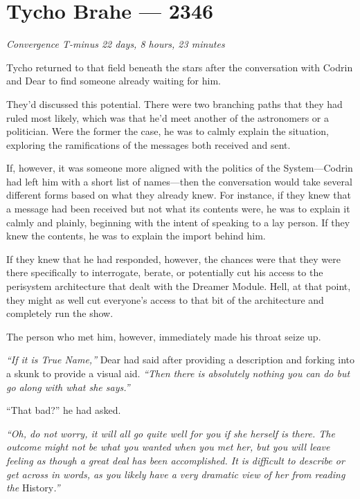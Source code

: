 \hypertarget{tycho-brahe-2346}{%
\chapter{Tycho Brahe — 2346}}

\begin{center}
\emph{Convergence T-minus 22 days, 8 hours, 23 minutes}
\end{center}

\noindent Tycho returned to that field beneath the stars after the conversation with Codrin and Dear to find someone already waiting for him.

They'd discussed this potential. There were two branching paths that they had ruled most likely, which was that he'd meet another of the astronomers or a politician. Were the former the case, he was to calmly explain the situation, exploring the ramifications of the messages both received and sent.

If, however, it was someone more aligned with the politics of the System—Codrin had left him with a short list of names—then the conversation would take several different forms based on what they already knew. For instance, if they knew that a message had been received but not what its contents were, he was to explain it calmly and plainly, beginning with the intent of speaking to a lay person. If they knew the contents, he was to explain the import behind him.

If they knew that he had responded, however, the chances were that they were there specifically to interrogate, berate, or potentially cut his access to the perisystem architecture that dealt with the Dreamer Module. Hell, at that point, they might as well cut everyone's access to that bit of the architecture and completely run the show.

The person who met him, however, immediately made his throat seize up.

\emph{``If it is True Name,''} Dear had said after providing a description and forking into a skunk to provide a visual aid. \emph{``Then there is absolutely nothing you can do but go along with what she says.''}

``That bad?'' he had asked.

\emph{``Oh, do not worry, it will all go quite well for you if she herself is there. The outcome might not be what you wanted when you met her, but you will leave feeling as though a great deal has been accomplished. It is difficult to describe or get across in words, as you likely have a very dramatic view of her from reading the} History\emph{.''}

